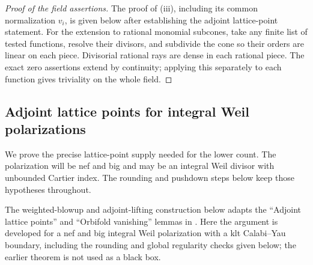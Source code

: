 \begin{proof}[Proof of the field assertions]
The proof of (iii), including its common normalization $v_i$, is given
below after establishing the adjoint lattice-point statement.  For the
extension to rational monomial subcones, take any finite list of tested
functions, resolve their divisors, and subdivide the cone so their
orders are linear on each piece.  Divisorial rational rays are dense
in each rational piece.  The exact zero assertions extend by continuity;
applying this separately to each function gives triviality on the
whole field.
\end{proof}

\subsection{Adjoint lattice points for integral Weil polarizations}
\label{subsec:C-adjoint}

We prove the precise lattice-point supply needed for the lower count.
The polarization will be nef and big and may be an integral Weil
divisor with unbounded Cartier index.  The rounding and pushdown steps
below keep those hypotheses throughout.

The weighted-blowup and adjoint-lifting construction below adapts the
``Adjoint lattice points'' and ``Orbifold vanishing'' lemmas in
\cite{OpenAIAdjointSemigroup}.  Here the argument is developed for a nef
and big integral Weil polarization with a klt Calabi--Yau boundary,
including the rounding and global regularity checks given below; the
earlier theorem is not used as a black box.

